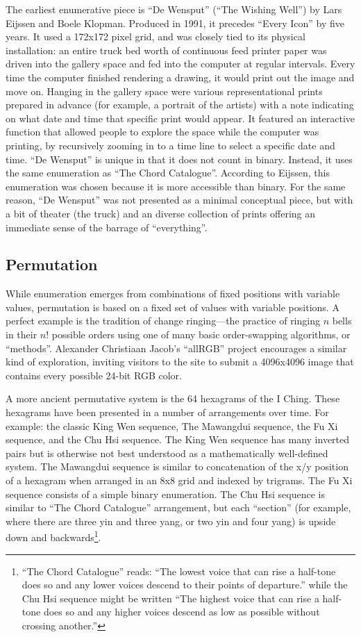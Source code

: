 \documentclass{thesis}
\begin{document}
The earliest enumerative piece is ``De Wensput'' (``The Wishing Well'') by Lars Eijssen and Boele Klopman.\cite{remko_scha_every_2001} Produced in 1991, it precedes ``Every Icon'' by five years. It used a 172x172 pixel grid, and was closely tied to its physical installation: an entire truck bed worth of continuous feed printer paper was driven into the gallery space and fed into the computer at regular intervals. Every time the computer finished rendering a drawing, it would print out the image and move on. Hanging in the gallery space were various representational prints prepared in advance (for example, a portrait of the artists) with a note indicating on what date and time that specific print would appear. It featured an interactive function that allowed people to explore the space while the computer was printing, by recursively zooming in to a time line to select a specific date and time. ``De Wensput'' is unique in that it does not count in binary. Instead, it uses the same enumeration as ``The Chord Catalogue''. According to Eijssen, this enumeration was chosen because it is more accessible than binary. For the same reason, ``De Wensput'' was not presented as a minimal conceptual piece, but with a bit of theater (the truck) and an diverse collection of prints offering an immediate sense of the barrage of ``everything''.

\subsection{Permutation}

While enumeration emerges from combinations of fixed positions with variable values, permutation is based on a fixed set of values with variable positions. A perfect example is the tradition of change ringing---the practice of ringing $n$ bells in their $n!$ possible orders using one of many basic order-swapping algorithms, or ``methods''. Alexander Christiaan Jacob's ``allRGB''\cite{alexander_christiaan_jacob_allrgb_2008} project encourages a similar kind of exploration, inviting visitors to the site to submit a 4096x4096 image that contains every possible 24-bit RGB color. 

A more ancient permutative system is the 64 hexagrams of the I Ching. These hexagrams have been presented in a number of arrangements over time. For example: the classic King Wen sequence, The Mawangdui sequence, the Fu Xi sequence, and the Chu Hsi sequence. The King Wen sequence has many inverted pairs but is otherwise not best understood as a mathematically well-defined system. The Mawangdui sequence is similar to concatenation of the x/y position of a hexagram when arranged in an 8x8 grid and indexed by trigrams. The Fu Xi sequence consists of a simple binary enumeration. The Chu Hsi sequence is similar to ``The Chord Catalogue'' arrangement, but each ``section'' (for example, where there are three yin and three yang, or two yin and four yang) is upside down and backwards\footnote{``The Chord Catalogue'' reads: ``The lowest voice that can rise a half-tone does so and any lower voices descend to their points of departure.'' while the Chu Hsi sequence might be written ``The highest voice that can rise a half-tone does so and any higher voices descend as low as possible without crossing another.''}.
\end{document}
